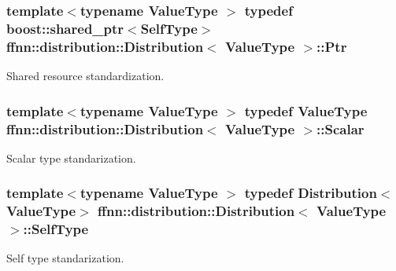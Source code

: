 \hypertarget{classffnn_1_1distribution_1_1_distribution_a51d4ea875b70b07862c5f68b20c8f41a}{
\subsubsection[{Ptr}]{\setlength{\rightskip}{0pt plus 5cm}template$<$typename Value\-Type $>$ typedef boost\-::shared\-\_\-ptr$<${\bf Self\-Type}$>$ {\bf ffnn\-::distribution\-::\-Distribution}$<$ Value\-Type $>$\-::{\bf Ptr}}}\label{classffnn_1_1distribution_1_1_distribution_a51d4ea875b70b07862c5f68b20c8f41a}


Shared resource standardization. 

\hypertarget{classffnn_1_1distribution_1_1_distribution_af0757b85660b34a2ae32a285cfdbfd1d}{
\subsubsection[{Scalar}]{\setlength{\rightskip}{0pt plus 5cm}template$<$typename Value\-Type $>$ typedef Value\-Type {\bf ffnn\-::distribution\-::\-Distribution}$<$ Value\-Type $>$\-::{\bf Scalar}}}\label{classffnn_1_1distribution_1_1_distribution_af0757b85660b34a2ae32a285cfdbfd1d}


Scalar type standarization. 

\hypertarget{classffnn_1_1distribution_1_1_distribution_ae1a3da8f16a034d6c051fcfdcf69f0d2}{
\subsubsection[{Self\-Type}]{\setlength{\rightskip}{0pt plus 5cm}template$<$typename Value\-Type $>$ typedef {\bf Distribution}$<$Value\-Type$>$ {\bf ffnn\-::distribution\-::\-Distribution}$<$ Value\-Type $>$\-::{\bf Self\-Type}}}\label{classffnn_1_1distribution_1_1_distribution_ae1a3da8f16a034d6c051fcfdcf69f0d2}


Self type standarization. 



